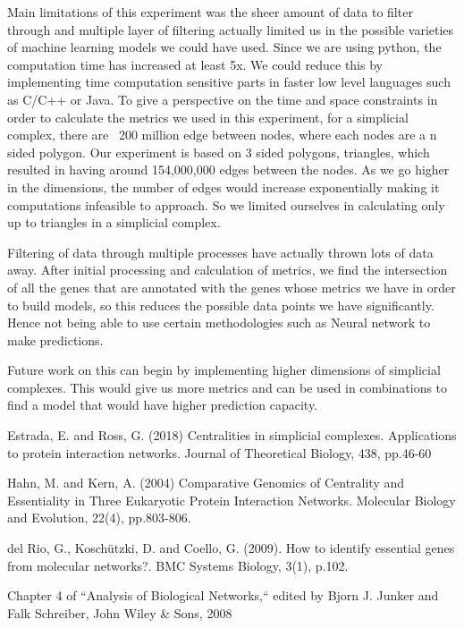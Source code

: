 \documentclass[9pt]{article}
\begin{document}
{Main limitations of this experiment was the sheer amount of data to filter through and multiple layer of filtering actually limited us in the possible varieties of machine learning models we could have used. Since we are using python, the computation time has increased at least 5x. We could reduce this by implementing time computation sensitive parts in faster low level languages such as C/C++ or Java. To give a perspective on the time and space constraints in order to calculate the metrics we used in this experiment, for a simplicial complex, there are ~200 million edge between nodes, where each nodes are a n sided polygon. Our experiment is based on 3 sided polygons, triangles, which resulted in having around 154,000,000 edges between the nodes. As we go higher in the dimensions, the number of edges would increase exponentially making it computations infeasible to approach. So we limited ourselves in calculating only up to triangles in a simplicial complex. 

Filtering of data through multiple processes have actually thrown lots of data away. After initial processing and calculation of metrics, we find the intersection of all the genes that are annotated with the genes whose metrics we have in order to build models, so this reduces the possible data points we have significantly. Hence not being able to use certain methodologies such as Neural network to make predictions.

Future work on this can begin by implementing higher dimensions of simplicial complexes. This would give us more metrics and can be used in combinations to find a model that would have higher prediction capacity. 



\newpage
\begin{thebibliography}{8}
Estrada, E. and Ross, G. (2018)
Centralities in simplicial complexes. Applications to protein interaction networks. Journal of Theoretical Biology, 438, pp.46-60

Hahn, M. and Kern, A. (2004)
Comparative Genomics of Centrality and Essentiality in Three Eukaryotic Protein Interaction Networks. Molecular Biology and Evolution, 22(4), pp.803-806.

del Rio, G., Koschützki, D. and Coello, G. (2009). 
How to identify essential genes from molecular networks?. BMC Systems Biology, 3(1), p.102.

Chapter 4 of “Analysis of Biological Networks,“ edited by Bjorn J. Junker and Falk Schreiber, John Wiley \& Sons, 2008 


\end{thebibliography}}
\end{document}
